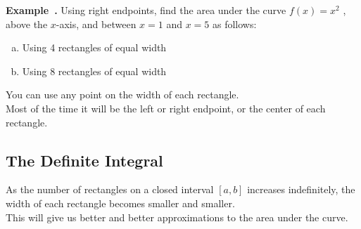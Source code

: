 \documentclass{article}
\newcounter{example}[section]
\newenvironment{example}[1][]{\refstepcounter{example}\par\medskip
   {\color{red}\textbf{Example~\theexample. #1}}}{\medskip}
\begin{document}
\begin{example}
Using right endpoints, find the area under the curve $f(x) = x^2$ , above the $x$-axis, and between $x = 1$ and $x = 5$ as follows:
\begin{enumerate}[(a)]
    \item Using 4 rectangles of equal width \newline\\
\vspace{0.25in}
\newpage 
    \item Using 8 rectangles of equal width \newline\\
\vspace{0.25in}
\end{enumerate}
\end{example}
\vspace{1.25in} 

You can use any point on the width of each rectangle. \newline\\

Most of the time it will be the left or right endpoint, or the center of each rectangle.
\vspace{1.5in}

\subsection*{The Definite Integral}

As the number of rectangles on a closed interval $[a,b]$ increases indefinitely, the width of each rectangle becomes smaller and smaller. \newline\\

This will give us better and better approximations to the area under the curve. \newline\\
\end{document}
